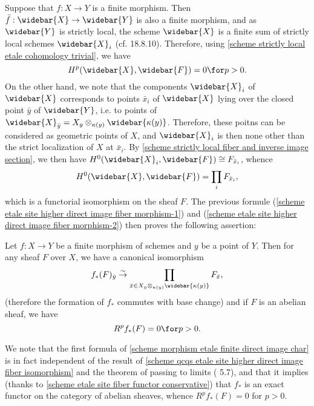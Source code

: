Suppose that $f:X\to Y$ is a finite morphism. Then $\bar{f}:\widebar{X}\to\widebar{Y}$ is also a finite morphism, and as $\widebar{Y}$ is strictly local, the scheme $\widebar{X}$ is a finite sum of strictly local schemes $\widebar{X}_i$ (cf. \cite{EGA4-4} 18.8.10). Therefore, using \cref{scheme strictly local etale cohomology trivial}, we have
\begin{equation}\label{scheme morphism etale finite direct image char-1}
H^p(\widebar{X},\widebar{F})=0\for p>0.
\end{equation}
On the other hand, we note that the components $\widebar{X}_i$ of $\widebar{X}$ corresponds to points $\bar{x}_i$ of $\widebar{X}$ lying over the closed point $\bar{y}$ of $\widebar{Y}$, i.e. to points of $\widebar{X}_{\bar{y}}=X_y\otimes_{\kappa(y)}\widebar{\kappa(y)}$. Therefore, these poitns can be considered as geometric points of $X$, and $\widebar{X}_i$ is then none other than the strict localization of $X$ at $\bar{x}_i$. By \cref{scheme strictly local fiber and inverse image section}, we then have $H^0(\widebar{X}_i,\widebar{F})\cong F_{\bar{x}_i}$, whence
\begin{equation}\label{scheme morphism etale finite direct image char-2}
H^0(\widebar{X},\widebar{F})=\prod_iF_{\bar{x}_i},
\end{equation}
which is a functorial isomorphism on the sheaf $F$. The previous formule (\ref{scheme etale site higher direct image fiber morphism-1}) and (\ref{scheme etale site higher direct image fiber morphism-2}) then proves the following assertion:
\begin{proposition}\label{scheme morphism etale finite direct image char}
Let $f:X\to Y$ be a finite morphism of schemes and $y$ be a point of $Y$. Then for any sheaf $F$ over $X$, we have a canonical isomorphism
\begin{equation}\label{scheme morphism etale finite direct image char-3}
f_*(F)_{\bar{y}}\stackrel{\sim}{\to} \prod_{\bar{x}\in X_y\otimes_{\kappa(y)}\widebar{\kappa(y)}}F_{\bar{x}},
\end{equation}
(therefore the formation of $f_*$ commutes with base change) and if $F$ is an abelian sheaf, we have 
\begin{equation}\label{scheme morphism etale finite direct image char-4}
R^pf_*(F)=0\for p>0.
\end{equation}
\end{proposition}

We note that the first formula of \cref{scheme morphism etale finite direct image char} is in fact independent of the result of \cref{scheme qcqs etale site higher direct image fiber isomorphism} and the theorem of passing to limits (\cite{SGA4-2}  5.7), and that it implies (thanks to \cref{scheme etale site fiber functor conservative}) that $f_*$ is an exact functor on the category of abelian sheaves, whence $R^pf_*(F)=0$ for $p>0$.

